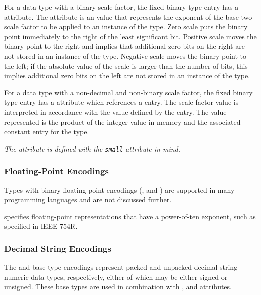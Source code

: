 For\hypertarget{chap:DWATbinaryscalebinaryscalefactorforfixedpointtype}{}
a data type with a binary scale factor, the fixed
binary type entry has a \DWATbinaryscaleNAME{} attribute. 
The \DWATbinaryscaleDEFN{} attribute 
is an  value
that represents the exponent of the base two scale factor to
be applied to an instance of the type.  Zero scale puts the
binary point immediately to the right of the least significant
bit. Positive scale moves the binary point to the right and
implies that additional zero bits on the right are not stored
in an instance of the type. Negative scale moves the binary
point to the left; if the absolute value of the scale is
larger than the number of bits, this implies additional zero
bits on the left are not stored in an instance of the type.

For\hypertarget{chap:DWATsmallscalefactorforfixedpointtype}{}
a data type with a non-decimal and non-binary scale factor,
the fixed binary type entry has a \DWATsmallDEFN{} attribute which
 references a 
\DWTAGconstant{} entry. The scale factor value
is interpreted in accordance with the value defined by the
\DWTAGconstant{} entry. The value represented is the product
of the integer value in memory and the associated constant
entry for the type.

\textit{The \DWATsmall{} attribute is defined with the 
 \texttt{small} attribute in mind.}

\subsubsection{Floating-Point Encodings}
\label{chap:floatingpointencodings}
Types with binary floating-point encodings 
(\DWATEfloat{}, \DWATEcomplexfloat{} and \DWATEimaginaryfloat{})
are supported in many
programming languages and 
\bb
are not discussed further.
\eb


\bb
\DWATEdecimalfloat{} specifies 
floating-point representations that have a power-of-ten
exponent, such as specified in IEEE 754R.
\eb

\subsubsection{Decimal String Encodings}
\label{chap:decimalstringencodings}
The \DWATEpackeddecimalDEFN{} and \DWATEnumericstringDEFN{} 
base type encodings
represent packed and unpacked decimal string numeric data
types, respectively, either of which may be either 
signed
or 
unsigned. These 
base types are used in combination with
\DWATdecimalsign, 
\DWATdigitcount{} and 
\DWATdecimalscale{}
attributes.

